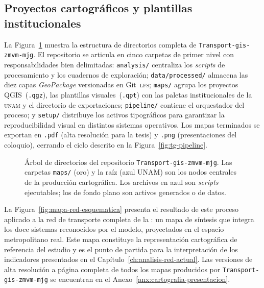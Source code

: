 
\subsection{Proyectos cartográficos y plantillas institucionales}
\label{subsubsec:tg-proyectos}

La Figura~\ref{fig:tg-arbol} muestra la estructura de directorios completa de
\texttt{Transport-gis-zmvm-mjg}. El repositorio se articula en cinco carpetas de primer
nivel con responsabilidades bien delimitadas: \texttt{analysis/} centraliza los
\textit{scripts} de procesamiento y los cuadernos de exploración;
\texttt{data/processed/} almacena las diez capas \textit{GeoPackage} versionadas
en Git~\textsc{lfs}; \texttt{maps/} agrupa los proyectos QGIS~(\texttt{.qgz}),
las plantillas visuales~(\texttt{.qpt}) con las paletas institucionales de la
\textsc{unam} y el directorio de exportaciones; \texttt{pipeline/} contiene el
orquestador del proceso; y \texttt{setup/} distribuye los activos tipográficos
para garantizar la reproducibilidad visual en distintos sistemas operativos. Los
mapas terminados se exportan en \texttt{.pdf} (alta resolución para la tesis) y
\texttt{.png} (presentaciones del coloquio), cerrando el ciclo descrito en la
Figura~\ref{fig:tg-pipeline}.

\begin{figure}[htbp]
\centering

\caption[Estructura de directorios de \texttt{Transport-gis-zmvm-mjg}]%
{Árbol de directorios del repositorio \texttt{Transport-gis-zmvm-mjg}. Las
carpetas \texttt{maps/} (oro) y la raíz (azul UNAM)
son los nodos centrales de la producción cartográfica. Los archivos en azul son
\textit{scripts} ejecutables;
  los de fondo plano son activos generados o de datos.}
\label{fig:tg-arbol}
\end{figure}

La Figura~\ref{fig:mapa-red-esquematica} presenta el resultado de este proceso
aplicado a la red de transporte completa de la \zmvm{}: un mapa de síntesis que
integra los doce sistemas reconocidos por el modelo, proyectados en el espacio
metropolitano real. Este mapa constituye la representación cartográfica de
referencia del estudio y es el punto de partida para la interpretación de los
indicadores presentados en el Capítulo~\ref{ch:analisis-red-actual}. Las
versiones de alta resolución a página completa de todos los mapas producidos por
\texttt{Transport-gis-zmvm-mjg} se encuentran en el
Anexo~\ref{anx:cartografia-presentacion}.

